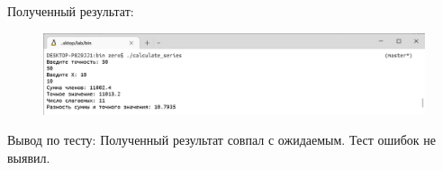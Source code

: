 \documentclass[a4paper]{article}
\begin{document}
\begin{enumerate}[label=\textbf{Тест \arabic*}]
		\hspace{3mm}
		Полученный результат:
		
		\begin{figure}[h]
			\includegraphics[width=\textwidth,trim=0.5mm 0 0 0.5mm,clip]{tests/test50.png}
		\end{figure}
		
		Вывод по тесту: Полученный результат совпал с ожидаемым. Тест ошибок не выявил.
	\end{enumerate}
	
\end{document}
